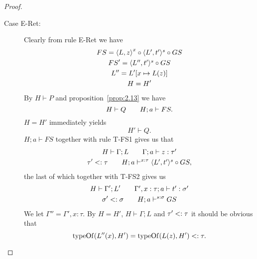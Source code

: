 \begin{proof}
\begin{description}
\begin{description}
        \item[Case {\sc E-Ret}:] Clearly from rule {\sc E-Ret} we have
          \begin{equation}
            \begin{gathered}
              FS = \mbox{$\langle L, z \rangle$}^x \circ \mbox{$\langle L', t' \rangle^s$} \circ GS \\
              FS' = \mbox{$\langle L'', t' \rangle^s$} \circ GS \\
              L'' = L'[x \mapsto L(z)] \\
              H = H'
            \end{gathered}
          \end{equation}
          By $H \vdash P$ and proposition~\ref{prop:2.13} we have
          \begin{equation} \label{eq:eret-hp0}
            H \vdash Q \quad\quad H; a \vdash FS.
          \end{equation}
          $H = H'$ immediately yields
          \begin{equation}
            H' \vdash Q.
          \end{equation}
          $H; a \vdash FS$ together with rule {\sc T-FS1} gives us that
          \begin{equation}
            \begin{gathered}
              H \vdash \Gamma; L \quad\quad \mbox{$\Gamma;a\vdash z:\tau'$} \\
              \tau' <: \tau \quad\quad H; a \vdash^{x: \tau} \mbox{$\langle L', t' \rangle^s$} \circ GS,
            \end{gathered}
          \end{equation}
          the last of which together with {\sc T-FS2} gives us
          \begin{equation} \label{eq:eret-hp1}
            \begin{gathered}
              H \vdash \Gamma'; L' \quad\quad \mbox{$\Gamma', x:
              \tau;a\vdash t':\sigma'$} \\
              \sigma' <: \sigma \quad\quad H; a \vdash^{s: \sigma} GS
            \end{gathered}
          \end{equation}
          We let $\Gamma'' = \Gamma', x : \tau$. By $H = H'$, $H \vdash \Gamma;
          L$ and $\tau' <: \tau$ it should be obvious that
          \begin{equation} \label{eq:eret-hp3}
            \mbox{$\mathrm{typeOf}$}(L''(x), H') = \mbox{$\mathrm{typeOf}$}(L(z), H') <: \tau.
          \end{equation}

\end{description}
\end{description}
\end{proof}
